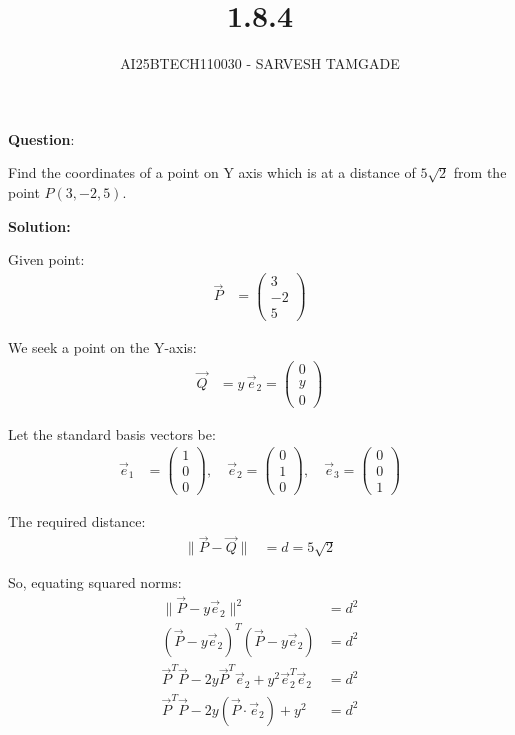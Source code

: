 \documentclass{article}
\title{1.8.4}
\author{AI25BTECH110030 - SARVESH TAMGADE}
\begin{document}
{\let\newpage\relax\maketitle}

\textbf{Question}:

Find the coordinates of a point on Y axis which is at a distance of \( 5\sqrt{2} \) from the point \( P(3, -2, 5) \).

\textbf{Solution:}

Given point:
\begin{align}
\vec{P} &= \begin{pmatrix} 3 \\ -2 \\ 5 \end{pmatrix}
\end{align}

We seek a point on the Y-axis:
\begin{align}
\vec{Q} &= y\,\vec{e}_2 = \begin{pmatrix} 0 \\ y \\ 0 \end{pmatrix}
\end{align}

Let the standard basis vectors be:
\begin{align}
\vec{e}_1 &= \begin{pmatrix} 1 \\ 0 \\ 0 \end{pmatrix}, \quad
\vec{e}_2 = \begin{pmatrix} 0 \\ 1 \\ 0 \end{pmatrix}, \quad
\vec{e}_3 = \begin{pmatrix} 0 \\ 0 \\ 1 \end{pmatrix}
\end{align}

The required distance:
\begin{align}
\|\vec{P} - \vec{Q}\| &= d = 5\sqrt{2}
\end{align}

So, equating squared norms:
\begin{align}
\|\vec{P} - y\vec{e}_2\|^2 &= d^2 \\
(\vec{P} - y\vec{e}_2)^T (\vec{P} - y\vec{e}_2) &= d^2 \\
\vec{P}^T \vec{P} - 2y \vec{P}^T \vec{e}_2 + y^2 \vec{e}_2^T \vec{e}_2 &= d^2 \\
\vec{P}^T \vec{P} - 2y (\vec{P} \cdot \vec{e}_2) + y^2 &= d^2
\end{align}
\end{document}

